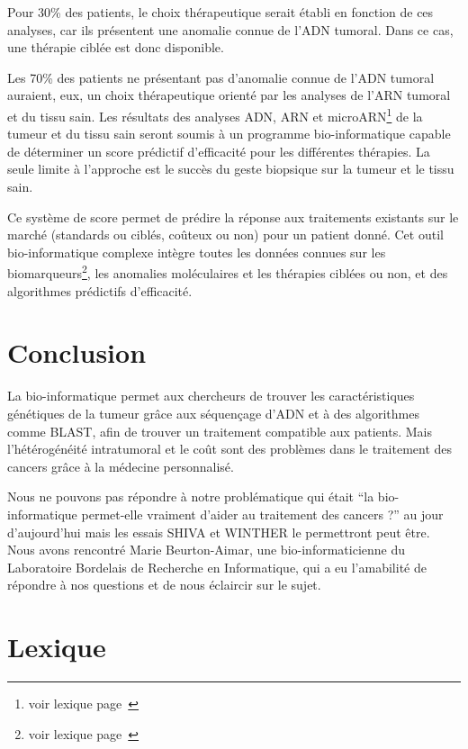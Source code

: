 \documentclass[12pt, openany]{report}
\begin{document}
Pour 30\% des patients, le choix thérapeutique serait établi en fonction de ces analyses, car ils présentent une anomalie connue de l’ADN tumoral. Dans ce cas, une thérapie ciblée est donc disponible. 

Les 70\% des patients ne présentant pas d’anomalie connue de l’ADN tumoral auraient, eux, un choix thérapeutique orienté par les analyses de l’ARN tumoral et du tissu sain. Les résultats des analyses ADN, ARN et microARN\footnote{voir lexique page~\pageref{lexique}} de la tumeur et du tissu sain seront soumis à un programme bio-informatique capable de déterminer un score prédictif d’efficacité pour les différentes thérapies. La seule limite à l’approche est le succès du geste biopsique sur la tumeur et le tissu sain.

Ce système de score permet de prédire la réponse aux traitements existants sur le marché (standards ou ciblés, coûteux ou non) pour un patient donné. Cet outil bio-informatique complexe intègre toutes les données connues sur les biomarqueurs\footnote{voir lexique page~\pageref{lexique}}, les anomalies moléculaires et les thérapies ciblées ou non, et des algorithmes prédictifs d’efficacité.


\chapter{Conclusion}

La bio-informatique permet aux chercheurs de trouver les caractéristiques génétiques de la tumeur grâce aux séquençage d’ADN et à des algorithmes comme BLAST, afin de trouver un traitement compatible aux patients. Mais l’hétérogénéité intratumoral et le coût sont des problèmes dans le traitement des cancers grâce à la médecine personnalisé. 

Nous ne pouvons pas répondre à notre problématique qui était “la bio-informatique permet-elle vraiment d'aider au traitement des cancers ?” au jour d’aujourd’hui mais les essais SHIVA et WINTHER le permettront peut être. Nous avons rencontré Marie Beurton-Aimar\cite{BA2015}, une bio-informaticienne du Laboratoire Bordelais de Recherche en Informatique, qui a eu l’amabilité de répondre à nos questions et de nous éclaircir sur le sujet.    

\chapter*{Lexique}\label{lexique}
\end{document}
